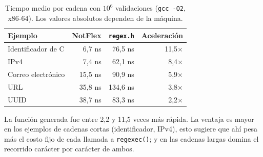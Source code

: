 \documentclass[runningheads]{llncs}
\begin{document}
\begin{table}[htbp]
\centering
\caption{Tiempo medio por cadena con $10^6$ validaciones (\texttt{gcc -O2}, x86-64). Los valores absolutos dependen de la máquina.}
\label{tab:desempeno}
\small
\setlength{\tabcolsep}{12pt}
\begin{tabular}{@{}lrrr@{}}
\toprule
\textbf{Ejemplo} & \textbf{NotFlex} & \textbf{\texttt{regex.h}} & \textbf{Aceleración} \\
\midrule
Identificador de C & 6,7 ns  & 76,5 ns  & 11,5$\times$ \\
IPv4               & 7,4 ns  & 62,1 ns  & 8,4$\times$ \\
Correo electrónico & 15,5 ns & 90,9 ns  & 5,9$\times$ \\
URL                & 35,8 ns & 134,6 ns & 3,8$\times$ \\
UUID               & 38,7 ns & 83,3 ns  & 2,2$\times$ \\
\bottomrule
\end{tabular}
\end{table}

La función generada fue entre 2,2 y 11,5 veces más rápida. La ventaja es mayor en los ejemplos de cadenas cortas (identificador, IPv4), esto sugiere que ahí pesa más el costo fijo de cada llamada a \texttt{regexec()}; y en las cadenas largas domina el recorrido carácter por carácter de ambos.

\end{document}
